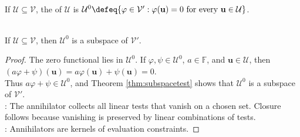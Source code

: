\begin{definition} \\
If $\mathcal{U}\subseteq\mathcal{V}$, the  of $\mathcal{U}$ is $\mathcal{U}^0\defeq\{\varphi\in\mathcal{V}':\varphi(\mathbf{u})=0 \text{ for every } \mathbf{u}\in\mathcal{U}\}$.
\end{definition}

\begin{proposition} \label{prop:annihilator-is-subspace} \\
If $\mathcal{U}\subseteq\mathcal{V}$, then $\mathcal{U}^0$ is a subspace of $\mathcal{V}'$.
\begin{proof}
The zero functional lies in $\mathcal{U}^0$. If $\varphi,\psi\in\mathcal{U}^0$, $a\in\mathbb{F}$, and $\mathbf{u}\in\mathcal{U}$, then $(a\varphi+\psi)(\mathbf{u})=a\varphi(\mathbf{u})+\psi(\mathbf{u})=0$.\\
Thus $a\varphi+\psi\in\mathcal{U}^0$, and Theorem \ref{thm:subspacetest} shows that $\mathcal{U}^0$ is a subspace of $\mathcal{V}'$.\\
: The annihilator collects all linear tests that vanish on a chosen set. Closure follows because vanishing is preserved by linear combinations of tests.\\
: Annihilators are kernels of evaluation constraints.
\end{proof}
\end{proposition}

